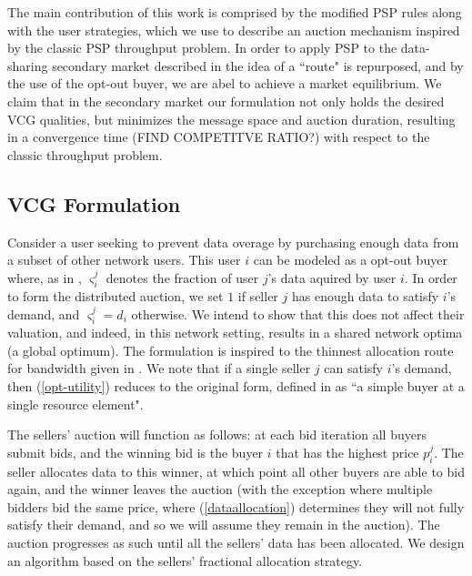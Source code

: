 \documentclass[12pt]{article}
\theoremstyle{definition}
\newcommand{\vs}{\varsigma}
\begin{document}
\begin{multicols}{2}
The main contribution of this work is comprised by the modified PSP rules
along with the user strategies, which we use to
describe an auction mechanism inspired by the classic PSP throughput problem. In order to apply PSP to the data-sharing secondary market described in
\cite{zheng} the idea of a ``route" is repurposed, and by the use of the
opt-out buyer, we are abel to achieve a market equilibrium. We claim that in
the secondary market our
formulation not only holds the desired VCG qualities, but minimizes the message
space and auction duration, resulting in a convergence time (FIND COMPETITVE RATIO?)
with respect to the classic throughput problem.


\subsection{VCG Formulation}
Consider a user seeking to prevent
data overage by purchasing enough data from a subset of other network users.
This user $i$ can be modeled as a opt-out buyer where, as in \cite{semret}, $\vs_i^j$ denotes the
fraction of user $j$'s data aquired by user $i$. In order to form the
distributed auction, we set $1$ if seller $j$ has enough data to
satisfy $i$'s demand, and $\vs_i^j=d_i$ otherwise. We intend to show that this
does not affect their valuation, and indeed, in this network setting, results in a shared network optima (a
global optimum). The formulation is inspired to the thinnest allocation route for
bandwidth given in \cite{lazar}. We note that if a single seller $j$ can
satisfy $i$'s demand, then
(\ref{opt-utility}) reduces to the original form, defined in
\cite{semret} as ``a simple buyer at a single resource element".

The sellers' auction will function as follows: at each bid iteration all buyers
submit bids, and the winning bid is the buyer $i$ that has the highest price
$p_i^j$. The seller allocates
data to this winner, at which point all other buyers are able to bid again, and
the winner leaves the auction (with the exception where multiple bidders bid
the same price, where (\ref{dataallocation}) determines they will not fully
satisfy their demand, and so we will assume they remain in the auction). The auction progresses as such until all the
sellers' data has been allocated. We design an algorithm based on the sellers'
fractional allocation strategy.


\end{multicols}
\end{document}
